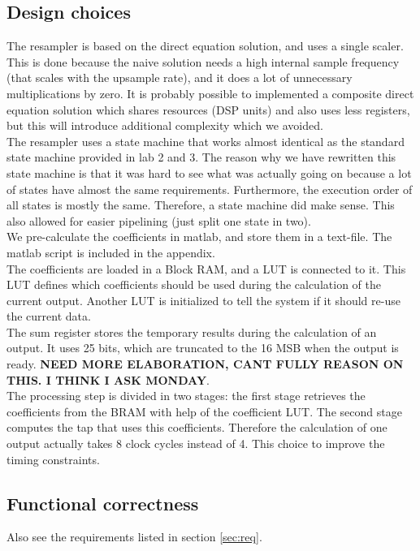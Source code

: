\documentclass[a4paper,twoside,11pt, fleqn]{article}
\begin{document}
\newpage
\subsection{Design choices}
The resampler is based on the direct equation solution, and uses a single scaler. This is done because the naive solution needs a high internal sample frequency (that scales  with the upsample rate), and it does a lot of unnecessary multiplications by zero. It is probably possible to implemented a composite direct equation solution which shares resources (DSP units) and also uses less registers, but this will introduce additional complexity which we avoided.\\

The resampler uses a state machine that works almost identical as the standard state machine provided in lab 2 and 3. The reason why we have rewritten this state machine is that it was hard to see what was actually going on because a lot of states have almost the same requirements. Furthermore, the execution order of all states is mostly the same. Therefore, a state machine did make sense. This also allowed for easier pipelining (just split one state in two).\\

We pre-calculate the coefficients in matlab, and store them in a text-file. The matlab script is included in the appendix.\\

The coefficients are loaded in a Block RAM, and a LUT is connected to it. This LUT defines which coefficients should be used during the calculation of the current output. Another LUT is initialized to tell the system if it should re-use the current data.\\

The sum register stores the temporary results during the calculation of an output. It uses 25 bits, which are truncated to the 16 MSB when the output is ready. 
\textbf{NEED MORE ELABORATION, CANT FULLY REASON ON THIS. I THINK I ASK MONDAY}.\\

The processing step is divided in two stages: the first stage retrieves the coefficients from the BRAM with help of the coefficient LUT. The second stage computes the tap that uses this coefficients. Therefore the calculation of one output actually takes 8 clock cycles instead of 4. This choice to improve the timing constraints.

\subsection{Functional correctness}
Also see the requirements listed in section \ref{sec:req}.
\end{document}
